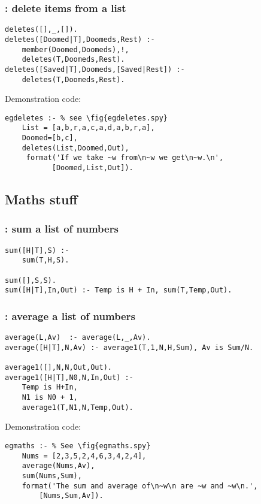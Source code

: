 \subsubsection{ :  delete items from a list 
}
\label{sec:deletes/3}
\begin{Verbatim} 
deletes([],_,[]).
deletes([Doomed|T],Doomeds,Rest) :- 
    member(Doomed,Doomeds),!,
    deletes(T,Doomeds,Rest).
deletes([Saved|T],Doomeds,[Saved|Rest]) :-
    deletes(T,Doomeds,Rest).
\end{Verbatim}
 Demonstration code: 
\begin{Verbatim}
egdeletes :- % see \fig{egdeletes.spy}
    List = [a,b,r,a,c,a,d,a,b,r,a],
    Doomed=[b,c],
    deletes(List,Doomed,Out),
     format('If we take ~w from\n~w we get\n~w.\n',
           [Doomed,List,Out]).
\end{Verbatim}
\subsection{ Maths stuff 
}
\label{sec:maths}
\subsubsection{ : sum a list of numbers }\begin{Verbatim}
sum([H|T],S) :- 
    sum(T,H,S).

sum([],S,S).
sum([H|T],In,Out) :- Temp is H + In, sum(T,Temp,Out).
\end{Verbatim}
\subsubsection{ : average a list of numbers }\begin{Verbatim}
average(L,Av)  :- average(L,_,Av).
average([H|T],N,Av) :- average1(T,1,N,H,Sum), Av is Sum/N.

average1([],N,N,Out,Out).
average1([H|T],N0,N,In,Out) :-
    Temp is H+In,
    N1 is N0 + 1,
    average1(T,N1,N,Temp,Out).
\end{Verbatim}
Demonstration code:
\begin{Verbatim}
egmaths :- % See \fig{egmaths.spy}
    Nums = [2,3,5,2,4,6,3,4,2,4],
    average(Nums,Av),
    sum(Nums,Sum),
    format('The sum and average of\n~w\n are ~w and ~w\n.',
        [Nums,Sum,Av]).
\end{Verbatim}
